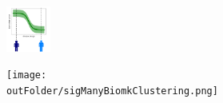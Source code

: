 \begin{frame}
\begin{columns}[T]
\begin{column}{.3\textwidth}
    \begin{figure}
    \centering
    \includegraphics[height=1.5cm, trim=120 0 120 0]{Disease_progression_one_sigmoid_confidence.png}
    \end{figure}
    
    \begin{figure}
    \centering
    \texttt{[image: \\outFolder/sigManyBiomkClustering.png]}
    \end{figure}

    \end{column}
  \end{columns}
  
  \vspace{6em}
  
% 
%   


\end{frame}




